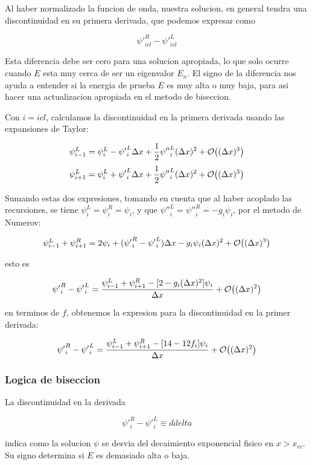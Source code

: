 \documentclass[11pt]{article}
\begin{document}
Al haber normalizado la funcion de onda, nuestra solucion, en general tendra una discontinuidad en su primera derivada, que podemos expresar como

\[ {\psi'}_{icl}^{R} - {\psi'}_{icl}^{L} \]

Esta diferencia debe ser cero para una solucion apropiada, lo que solo ocurre cuando \(E\) esta muy cerca de ser un eigenvalor \(E_n\). El signo de la diferencia nos ayuda a entender si la energia de prueba \(E\) es muy alta o muy baja, para asi hacer una actualizacion apropiada en el metodo de biseccion.

Con \(i = icl\), calculamos la discontinuidad en la primera derivada usando las expansiones de Taylor:

\[ \psi_{i-1}^L = \psi_i^L - {\psi'}_i^L \Delta x + \frac{1}{2}{\psi''}_i^L (\Delta x)^2 + \order{(\Delta x)^3} \]
\[ \psi_{i+1}^L = \psi_i^L + {\psi'}_i^L \Delta x + \frac{1}{2}{\psi''}_i^L (\Delta x)^2 + \order{(\Delta x)^3} \]

Sumando estas dos expresiones, tomando en cuenta que al haber acoplado las recursiones, se tiene \(\psi_i^L = \psi_i^R = \psi_i\), y que \({\psi''}_i^L = {\psi''}_i^{R} = -g_i\psi_i\), por el metodo de Numerov:

\[ \psi^L_{i-1} + \psi^R_{i+1} = 2\psi_i + ({\psi'}_i^R - {\psi'}_i^L)\Delta x - g_i\psi_i(\Delta x)^2 + \order{(\Delta x)^3} \]

esto es

\[ {\psi'}_i^R - {\psi'}_i^L = \frac{\psi_{i-1}^L + \psi_{i+1}^R - [2-g_i(\Delta x)^2]\psi_i}{\Delta x} + \order{(\Delta x)^2} \]

en terminos de \(f\), obtenemos la expresion para la discontinuidad en la primer derivada:

\[ {\psi'}_i^R - {\psi'}_i^L = \frac{\psi_{i-1}^L + \psi_{i+1}^R - [14-12f_i]\psi_i}{\Delta x} + \order{(\Delta x)^2} \]
\subsubsection{Logica de biseccion}
\label{sec:org986608a}

La discontinuidad en la derivada

\[ {\psi'}_i^R - {\psi'}_i^L \equiv ddelta  \]

indica como la solucion \(\psi\) se desvia del decaimiento exponencial fisico en \(x>x_{rc}\). Su signo determina si \(E\) es demasiado alta o baja.
\end{document}
